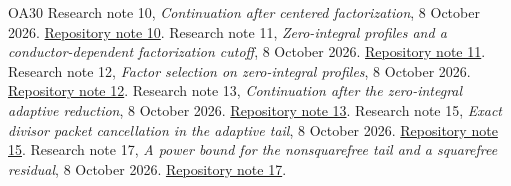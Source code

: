 \documentclass[11pt]{article}
\numberwithin{equation}{section}
\theoremstyle{definition}
\theoremstyle{remark}
\begin{document}
\begin{thebibliography}{OA30}
Research note 10, \emph{Continuation after centered factorization}, 8 October 2026.
\href{notes/10_SHORT_FAMILY_FACTORIZATION_CONTINUATION_20261008.md}{Repository note 10}.
Research note 11, \emph{Zero-integral profiles and a conductor-dependent factorization cutoff}, 8 October 2026.
\href{notes/11_SHORT_FAMILY_MEAN_ZERO_ADAPTIVE_REDUCTION_20261008.md}{Repository note 11}.
Research note 12, \emph{Factor selection on zero-integral profiles}, 8 October 2026.
\href{notes/12_SHORT_FAMILY_FACTOR_SELECTION_BARRIER_20261008.md}{Repository note 12}.
Research note 13, \emph{Continuation after the zero-integral adaptive reduction}, 8 October 2026.
\href{notes/13_SHORT_FAMILY_ADAPTIVE_CONTINUATION_20261008.md}{Repository note 13}.
Research note 15, \emph{Exact divisor packet cancellation in the adaptive tail}, 8 October 2026.
\href{notes/15_SHORT_FAMILY_DIVISOR_PACKET_CANCELLATION_20261008.md}{Repository note 15}.
Research note 17, \emph{A power bound for the nonsquarefree tail and a squarefree residual}, 8 October 2026.
\href{notes/17_SHORT_FAMILY_SQUAREFREE_TAIL_REDUCTION_20261008.md}{Repository note 17}.
\end{thebibliography}
\end{document}
